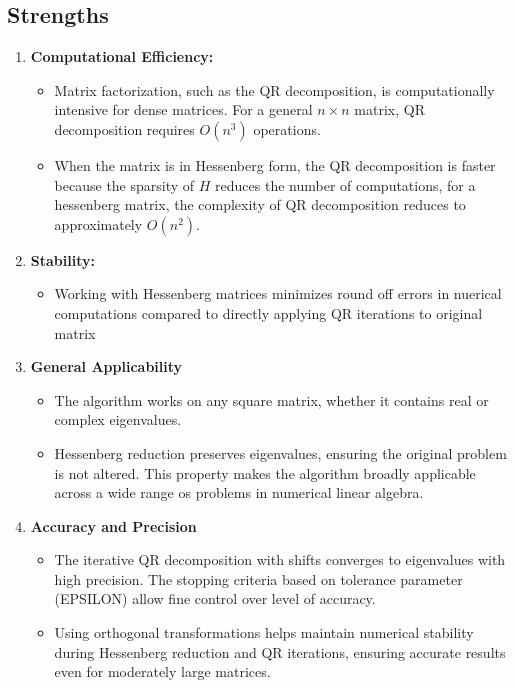\documentclass{article}
\begin{document}
\subsection{ Strengths}
\begin{enumerate}
\item  \textbf{Computational Efficiency:}
    \begin{itemize}
        \item Matrix factorization, such as the QR decomposition, is computationally intensive for dense matrices. For a general $n \times n$ matrix, QR decomposition requires $O(n^3)$ operations.
        \item When the matrix is in Hessenberg form, the QR decomposition is faster because the sparsity of $H$ reduces the number of computations, for a hessenberg matrix, the complexity of QR decomposition reduces to approximately $O(n^2)$.
    \end{itemize}
  
\item  \textbf{Stability:}
\begin{itemize}
    \item Working with Hessenberg matrices minimizes round off errors in nuerical computations compared to directly applying QR iterations to original matrix
\end{itemize}

\item \textbf{General Applicability}
\begin{itemize}
    \item The algorithm works on any square matrix, whether it contains real or complex eigenvalues.
    \item Hessenberg reduction preserves eigenvalues, ensuring the original problem is not altered. This property makes the algorithm broadly applicable across a wide range os problems in numerical linear algebra.
\end{itemize}

\item \textbf{Accuracy and Precision}
\begin{itemize}
    \item The iterative QR decomposition with shifts converges to eigenvalues with high precision. The stopping criteria based on tolerance parameter (EPSILON) allow fine control over level of accuracy.
    \item Using orthogonal transformations helps maintain numerical stability during Hessenberg reduction and QR iterations, ensuring accurate results even for moderately large matrices.
\end{itemize}
\end{enumerate}
\end{document}

